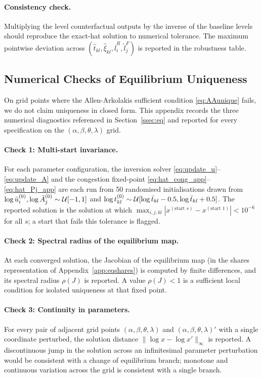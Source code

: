 \paragraph{Consistency check.}
Multiplying the level counterfactual outputs by the inverse of the
baseline levels should reproduce the exact-hat solution to numerical
tolerance.  The maximum pointwise deviation across
$(\hat t_{kl},\hat\xi_{kl},\hat l_i^R,\hat l_j^F)$ is reported in the
robustness table.

\subsection{Numerical Checks of Equilibrium Uniqueness}\label{app:uniqueness_numeric}

On grid points where the Allen-Arkolakis sufficient condition
\eqref{eq:AAunique} fails, we do not claim uniqueness in closed form.
This appendix records the three numerical diagnostics referenced in
Section~\ref{ssec:eq} and reported for every specification on the
$(\alpha,\beta,\theta,\lambda)$ grid.

\paragraph{Check 1: Multi-start invariance.}
For each parameter configuration, the inversion solver
\eqref{eq:update_u}--\eqref{eq:update_A} and the congestion
fixed-point \eqref{eq:hat_cong_app}--\eqref{eq:hat_Pj_app} are each
run from 50 randomised initialisations drawn from
$\log\bar u_i^{(0)},\log\bar A_j^{(0)}\sim\mathcal U[-1,1]$ and
$\log t_{kl}^{(0)}\sim\mathcal U[\log\bar t_{kl}-0.5,\log\bar t_{kl}+0.5]$.
The reported solution is the solution at which
$\max_{i,j,kl}|x^{(\text{start }s)}-x^{(\text{start }1)}|<10^{-6}$ for
all $s$; a start that fails this tolerance is flagged.

\paragraph{Check 2: Spectral radius of the equilibrium map.}
At each converged solution, the Jacobian of the equilibrium map (in
the shares representation of Appendix~\ref{app:eqshares}) is
computed by finite differences, and its spectral radius $\rho(J)$ is
reported.  A value $\rho(J)<1$ is a sufficient local condition for
isolated uniqueness at that fixed point.

\paragraph{Check 3: Continuity in parameters.}
For every pair of adjacent grid points
$(\alpha,\beta,\theta,\lambda)$ and
$(\alpha,\beta,\theta,\lambda)'$ with a single coordinate perturbed,
the solution distance
$\|\log x-\log x'\|_\infty$ is reported.  A discontinuous jump in the
solution across an infinitesimal parameter perturbation would be
consistent with a change of equilibrium branch; monotone and
continuous variation across the grid is consistent with a single
branch.

